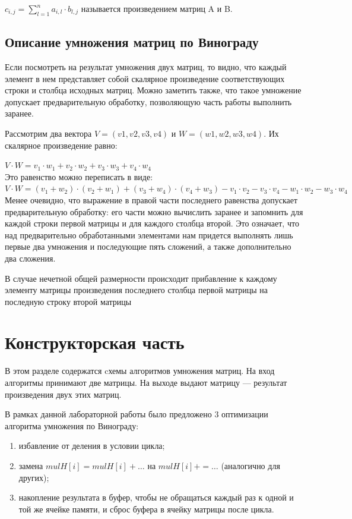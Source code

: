 \documentclass[12pt]{report}
\begin{document}
$c_{i,j} = \sum\limits_{l=1}^n a_{i,l}\cdot b_{l,j}$ называется произведением матриц A и B.

\section{Описание умножения матриц по Винограду}

Если посмотреть на результат умножения двух матриц, то видно, что каждый элемент в нем представляет собой скалярное произведение соответствующих строки и столбца исходных матриц. Можно заметить также, что такое умножение допускает предварительную обработку, позволяющую часть работы выполнить заранее.\vspace{\baselineskip}

Рассмотрим два вектора $V = (v1, v2, v3, v4)$ и $W = (w1, w2, w3, w4)$. Их скалярное произведение равно: 

$ V \cdot W=v_1 \cdot w_1 + v_2 \cdot w_2 + v_3 \cdot w_3 + v_4 \cdot w_4$ \\

Это равенство можно переписать в виде: \\
$V \cdot W=(v_1 + w_2) \cdot (v_2 + w_1) + (v_3 + w_4) \cdot (v_4 + w_3) - v_1 \cdot v_2 - v_3 \cdot v_4 - w_1 \cdot w_2 - w_3 \cdot w_4$\\

Менее очевидно, что выражение в правой части последнего равенства допускает предварительную обработку: его части можно вычислить заранее и запомнить для каждой строки первой матрицы и для каждого столбца второй. 
Это означает, что над предварительно обработанными элементами нам придется выполнять лишь первые два умножения и последующие пять сложений, а также дополнительно два сложения. 

В случае нечетной общей размерности происходит прибавление к каждому элементу матрицы произведения последнего столбца первой матрицы на последную строку второй матрицы



\chapter{Конструкторская часть}
В этом разделе содержатся cхемы алгоритмов умножения матриц.
На вход алгоритмы принимают две матрицы. На выходе выдают матрицу — результат произведения двух этих матриц.\vspace{\baselineskip}

В рамках данной лабораторной работы было предложено 3 оптимизации алгоритма умножения по Винограду:
\begin{enumerate}
	\item избавление от деления в условии цикла;
	\item замена $mulH[i] = mulH[i] + …$ на $mulH[i] += …$ (аналогично для других);
	\item накопление результата в буфер, чтобы не обращаться каждый раз к одной и той же ячейке памяти, и сброс буфера в ячейку матрицы после цикла.
\end{enumerate}
	
\end{document}
